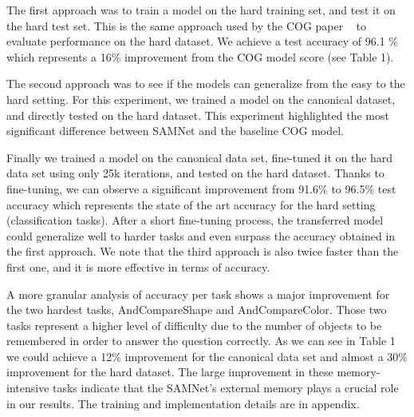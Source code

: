 The first approach was to train a model on the hard training set, and test it on the hard test set. This is the same approach used by the COG paper ~\cite{yang2018dataset} to evaluate performance on the hard dataset. We achieve a test accuracy of 96.1 \% which represents a 16\% improvement from the COG model score (see Table 1).

The second approach was to see if the models can generalize from the easy to the hard setting. For this experiment, we trained a model on the canonical dataset, and directly tested on the hard dataset.  This experiment highlighted the most significant difference between SAMNet and the baseline COG model.

Finally we trained a model on the canonical data set, fine-tuned it on the hard data set using only 25k iterations, and tested on the hard dataset. Thanks to fine-tuning, we can observe a significant improvement from 91.6\%  to 96.5\% test accuracy which represents the state of the art accuracy for the hard setting (classification tasks).
After a short fine-tuning process, the transferred model could generalize well to harder tasks and even surpass the accuracy obtained in the first approach. We note that the third approach is also twice faster than the first one, and it is more effective in terms of accuracy.

A more granular analysis of accuracy per task shows a major improvement for the two hardest tasks, AndCompareShape and AndCompareColor. Those two tasks represent a higher level of difficulty due to the number of objects to be remembered in order to answer the question correctly.
As we can see in Table 1 we could achieve a 12\% improvement for the canonical data set and almost a 30\% improvement for the hard dataset.
The large improvement in these memory-intensive tasks indicate that the SAMNet's external memory plays a crucial role in our results. 
The training and implementation details are in appendix.

